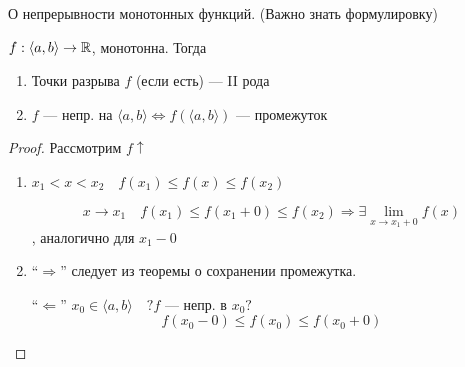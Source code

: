     \begin{theorem}
        О непрерывности монотонных функций. (Важно знать формулировку)

        $f:\langle a,b\rangle \to\mathbb{R}$, монотонна. Тогда
        \begin{enumerate}
            \item Точки разрыва $f$ (если есть) --- II рода
            \item $f$ --- непр. на $\langle a,b\rangle \Leftrightarrow f(\langle a,b\rangle)$ --- промежуток
        \end{enumerate}
    \end{theorem}
    \begin{proof}
        Рассмотрим $f\uparrow$
        \begin{enumerate}
            \item $x_1<x<x_2 \quad f(x_1)\leq f(x)\leq f(x_2)$
            
            $$x\to x_1 \quad f(x_1)\leq f(x_1+0)\leq f(x_2) \Rightarrow \exists\lim\limits_{x\to x_1+0} f(x)$$, аналогично для $x_1-0$
            
            \item ``$\Rightarrow$'' следует из теоремы о сохранении промежутка.
            
            ``$\Leftarrow$'' $x_0\in\langle a,b\rangle \quad ?f$ --- непр. в $x_0?$
            $$f(x_0-0)\leq f(x_0)\leq f(x_0+0)$$
        \end{enumerate}
    \end{proof}
